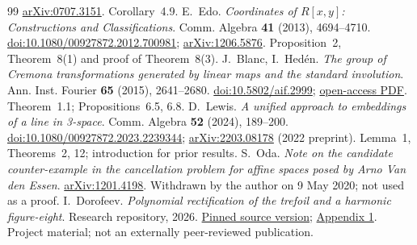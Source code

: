 \begin{thebibliography}{99}
\href{https://arxiv.org/abs/0707.3151}{arXiv:0707.3151}.
Corollary~4.9.
E.~Edo. \emph{Coordinates of $R[x,y]$: Constructions and Classifications}.
Comm. Algebra \textbf{41} (2013), 4694--4710.
\href{https://doi.org/10.1080/00927872.2012.700981}{doi:10.1080/00927872.2012.700981};
\href{https://arxiv.org/abs/1206.5876}{arXiv:1206.5876}.
Proposition~2, Theorem~8(1) and proof of Theorem~8(3).
J.~Blanc, I.~Hedén. \emph{The group of Cremona transformations generated
by linear maps and the standard involution}.
Ann. Inst. Fourier \textbf{65} (2015), 2641--2680.
\href{https://doi.org/10.5802/aif.2999}{doi:10.5802/aif.2999};
\href{https://www.numdam.org/item/10.5802/aif.2999.pdf}{open-access PDF}.
Theorem~1.1; Propositions~6.5, 6.8.
D.~Lewis. \emph{A unified approach to embeddings of a line in 3-space}.
Comm. Algebra \textbf{52} (2024), 189--200.
\href{https://doi.org/10.1080/00927872.2023.2239344}{doi:10.1080/00927872.2023.2239344};
\href{https://arxiv.org/abs/2203.08178}{arXiv:2203.08178} (2022 preprint).
Lemma~1, Theorems~2, 12; introduction for prior results.
S.~Oda. \emph{Note on the candidate counter-example in the cancellation
problem for affine spaces posed by Arno Van den Essen}.
\href{https://arxiv.org/abs/1201.4198}{arXiv:1201.4198}.
Withdrawn by the author on 9 May 2020; not used as a proof.
I.~Dorofeev. \emph{Polynomial rectification of the trefoil and a harmonic
figure-eight}. Research repository, 2026.
\href{https://github.com/qft98romanov-hash/abhyankar-moh-trefoil/tree/b954f3609e900761fddc9c8ff03d8301e9604cab}{Pinned source version};
\href{https://github.com/qft98romanov-hash/abhyankar-moh-trefoil/tree/b954f3609e900761fddc9c8ff03d8301e9604cab/appendices/2026-10-26-harmonic-lnd}{Appendix 1}.
Project material; not an externally peer-reviewed publication.
\end{thebibliography}

